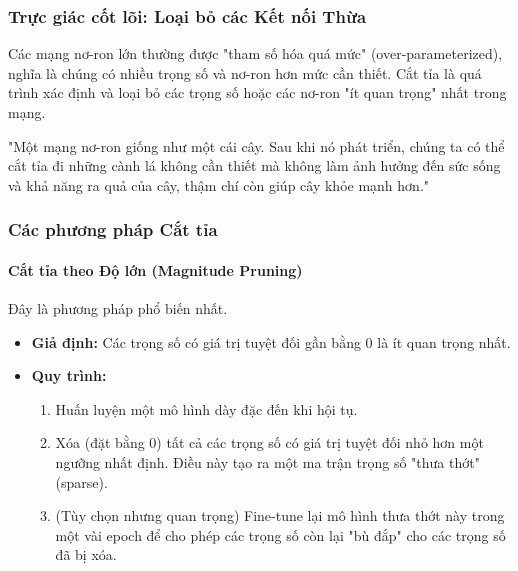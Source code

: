 \subsubsection{Trực giác cốt lõi: Loại bỏ các Kết nối Thừa}
Các mạng nơ-ron lớn thường được "tham số hóa quá mức" (over-parameterized), nghĩa là chúng có nhiều trọng số và nơ-ron hơn mức cần thiết. Cắt tỉa là quá trình xác định và loại bỏ các trọng số hoặc các nơ-ron "ít quan trọng" nhất trong mạng.

\begin{tcolorbox}[
    title=Triết lý của Cắt tỉa,
    colback=red!5!white, colframe=red!75!black, fonttitle=\bfseries
]
"Một mạng nơ-ron giống như một cái cây. Sau khi nó phát triển, chúng ta có thể cắt tỉa đi những cành lá không cần thiết mà không làm ảnh hưởng đến sức sống và khả năng ra quả của cây, thậm chí còn giúp cây khỏe mạnh hơn."
\end{tcolorbox}

\subsubsection{Các phương pháp Cắt tỉa}
\paragraph{Cắt tỉa theo Độ lớn (Magnitude Pruning)}
Đây là phương pháp phổ biến nhất.
\begin{itemize}
    \item \textbf{Giả định:} Các trọng số có giá trị tuyệt đối gần bằng 0 là ít quan trọng nhất.
    \item \textbf{Quy trình:}
        \begin{enumerate}
            \item Huấn luyện một mô hình dày đặc đến khi hội tụ.
            \item Xóa (đặt bằng 0) tất cả các trọng số có giá trị tuyệt đối nhỏ hơn một ngưỡng nhất định. Điều này tạo ra một ma trận trọng số "thưa thớt" (sparse).
            \item (Tùy chọn nhưng quan trọng) Fine-tune lại mô hình thưa thớt này trong một vài epoch để cho phép các trọng số còn lại "bù đắp" cho các trọng số đã bị xóa.
        \end{enumerate}
\end{itemize}

